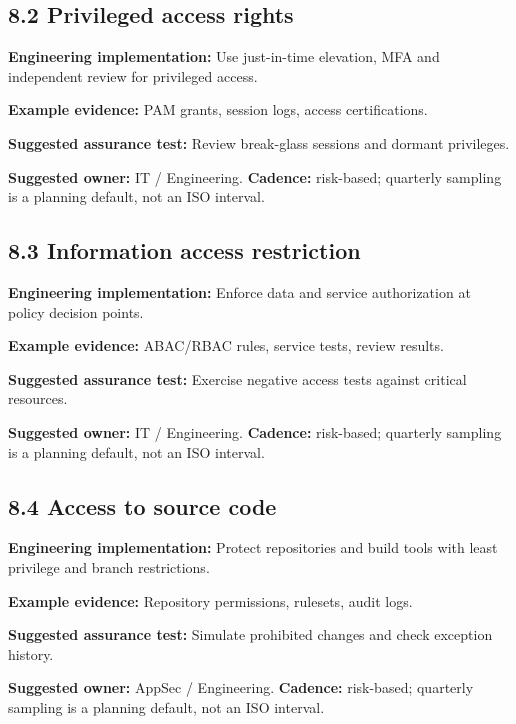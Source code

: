 \documentclass[11pt,letterpaper]{article}
\begin{document}
\subsection{8.2 Privileged access rights}
\textbf{Engineering implementation:} Use just-in-time elevation, MFA and independent review for privileged access.\par
\textbf{Example evidence:} PAM grants, session logs, access certifications.\par
\textbf{Suggested assurance test:} Review break-glass sessions and dormant privileges.\par
\textbf{Suggested owner:} IT / Engineering. \textbf{Cadence:} risk-based; quarterly sampling is a planning default, not an ISO interval.\par
{}
\subsection{8.3 Information access restriction}
\textbf{Engineering implementation:} Enforce data and service authorization at policy decision points.\par
\textbf{Example evidence:} ABAC/RBAC rules, service tests, review results.\par
\textbf{Suggested assurance test:} Exercise negative access tests against critical resources.\par
\textbf{Suggested owner:} IT / Engineering. \textbf{Cadence:} risk-based; quarterly sampling is a planning default, not an ISO interval.\par
{}
\subsection{8.4 Access to source code}
\textbf{Engineering implementation:} Protect repositories and build tools with least privilege and branch restrictions.\par
\textbf{Example evidence:} Repository permissions, rulesets, audit logs.\par
\textbf{Suggested assurance test:} Simulate prohibited changes and check exception history.\par
\textbf{Suggested owner:} AppSec / Engineering. \textbf{Cadence:} risk-based; quarterly sampling is a planning default, not an ISO interval.\par
{}
\end{document}
